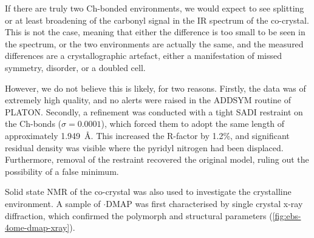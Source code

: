 \begin{refsection}

If there are truly two Ch-bonded environments, we would expect to see splitting or at least broadening of the carbonyl signal in the IR spectrum of the co-crystal.
This is not the case, meaning that either the difference is too small to be seen in the spectrum, or the two environments are actually the same, and the measured differences are a crystallographic artefact, either a manifestation of missed symmetry, disorder, or a doubled cell.

However, we do not believe this is likely, for two reasons.
Firstly, the data was of extremely high quality, and no alerts were raised in the ADDSYM routine of PLATON.\@
Secondly, a refinement was conducted with a tight SADI restraint on the Ch-bonds ($\sigma=0.0001$), which forced them to adopt the same length of approximately 1.949~\AA.\@
This increased the R-factor by 1.2\%, and significant residual density was visible where the pyridyl nitrogen had been displaced.
Furthermore, removal of the restraint recovered the original model, ruling out the possibility of a false minimum.

Solid state NMR of the co-crystal was also used to investigate the crystalline environment.
A sample of $ \cdot $DMAP was first characterised by single crystal x-ray diffraction, which confirmed the polymorph and structural parameters (\cref{fig:ebs-4ome-dmap-xray}).


\end{refsection}
